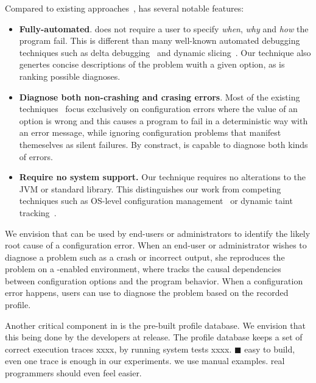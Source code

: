 
Compared to existing approaches~\cite{}, \ourtool has
several notable features:

\begin{itemize}
\item \textbf{Fully-automated}.
\ourtool does not require a user to specify
\textit{when}, \textit{why} and \textit{how} the program fail. This is
different than many well-known automated debugging techniques such
as delta debugging~\cite{} and dynamic slicing~\cite{}.
Our technique also genertes concise descriptions of the problem
wuith a given option, as is ranking possible diagnoses.

\item \textbf{Diagnose both non-crashing and crasing errors}.
Most of the existing techniques~\cite{} focus exclusively on configuration errors
where the value of an option is wrong and this causes a program
to fail in a deterministic way with an error message, while
ignoring configuration problems that manifest themeselves as
silent failures. By constract, \ourtool is capable to diagnose
both kinds of errors.

\item \textbf{Require no system support.} Our technique requires no alterations to
the JVM or standard library. This distinguishes our work from
competing techniques such as OS-level configuration
management~\cite{} or dynamic taint tracking~\cite{}.

\end{itemize}


We envision that \ourtool can be used by end-users or
administrators to identify the likely root cause of a configuration error.
When an end-user or administrator wishes to diagnose a
problem such as a crash or incorrect output, she
reproduces the problem on a \ourtool-enabled environment,
where \ourtool tracks the causal dependencies between
configuration options and the program behavior. 
When a configuration error happens, users can
use \ourtool to diagnose the problem based on the recorded profile.

Another critical component in \ourtool is the pre-built
profile database. We envision that this being done
by the developers at release. The profile database keeps
a set of correct execution traces xxxx, by running system
tests xxxx. $\blacksquare$ easy to build, even one trace
is enough in our experiments. we use manual examples. real programmers
should even feel easier.


